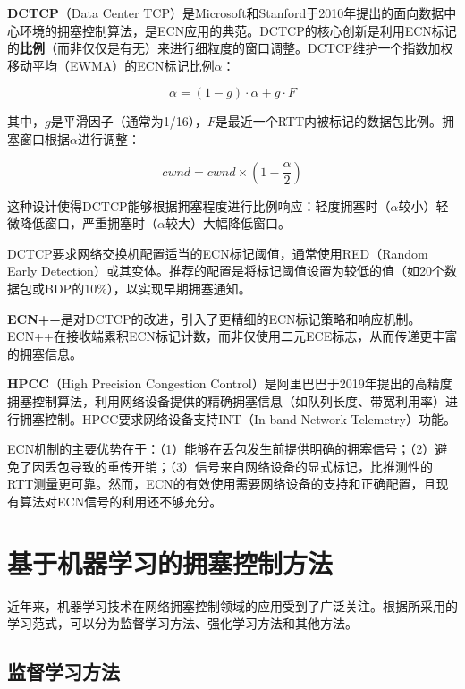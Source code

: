 \textbf{DCTCP}（Data Center TCP）是Microsoft和Stanford于2010年提出的面向数据中心环境的拥塞控制算法，是ECN应用的典范。DCTCP的核心创新是利用ECN标记的\textbf{比例}（而非仅仅是有无）来进行细粒度的窗口调整。DCTCP维护一个指数加权移动平均（EWMA）的ECN标记比例$\alpha$：

\begin{equation}
\alpha = (1 - g) \cdot \alpha + g \cdot F
\end{equation}

其中，$g$是平滑因子（通常为1/16），$F$是最近一个RTT内被标记的数据包比例。拥塞窗口根据$\alpha$进行调整：

\begin{equation}
cwnd = cwnd \times (1 - \frac{\alpha}{2})
\end{equation}

这种设计使得DCTCP能够根据拥塞程度进行比例响应：轻度拥塞时（$\alpha$较小）轻微降低窗口，严重拥塞时（$\alpha$较大）大幅降低窗口。

DCTCP要求网络交换机配置适当的ECN标记阈值，通常使用RED（Random Early Detection）或其变体。推荐的配置是将标记阈值设置为较低的值（如20个数据包或BDP的10\%），以实现早期拥塞通知。

\textbf{ECN++}是对DCTCP的改进，引入了更精细的ECN标记策略和响应机制。ECN++在接收端累积ECN标记计数，而非仅使用二元ECE标志，从而传递更丰富的拥塞信息。

\textbf{HPCC}（High Precision Congestion Control）是阿里巴巴于2019年提出的高精度拥塞控制算法，利用网络设备提供的精确拥塞信息（如队列长度、带宽利用率）进行拥塞控制。HPCC要求网络设备支持INT（In-band Network Telemetry）功能。

ECN机制的主要优势在于：（1）能够在丢包发生前提供明确的拥塞信号；（2）避免了因丢包导致的重传开销；（3）信号来自网络设备的显式标记，比推测性的RTT测量更可靠。然而，ECN的有效使用需要网络设备的支持和正确配置，且现有算法对ECN信号的利用还不够充分。

\section{基于机器学习的拥塞控制方法}

近年来，机器学习技术在网络拥塞控制领域的应用受到了广泛关注。根据所采用的学习范式，可以分为监督学习方法、强化学习方法和其他方法。

\subsection{监督学习方法}

